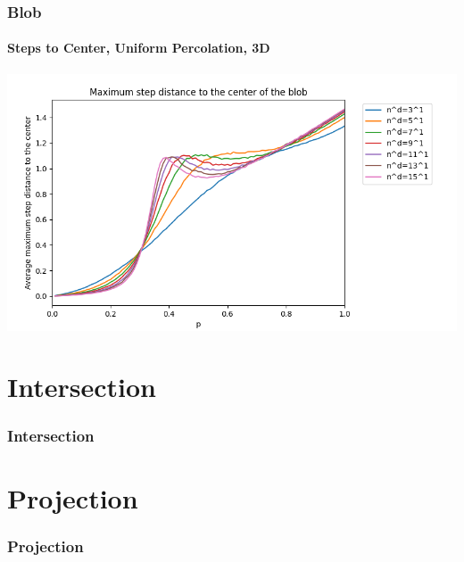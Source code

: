 \documentclass{beamer}
\begin{document}
	\begin{frame}
		\frametitle{Blob}
		\framesubtitle{Steps to Center, Uniform Percolation, 3D}
		\includegraphics[scale=0.5]{imgs/blob_step_3D_bis.png}
	\end{frame}

	\section{Intersection}
	\begin{frame}
		\frametitle{Intersection}
		
	\end{frame}

	\section{Projection}
	\begin{frame}
		\frametitle{Projection}
		
	\end{frame}

	
\end{document}
